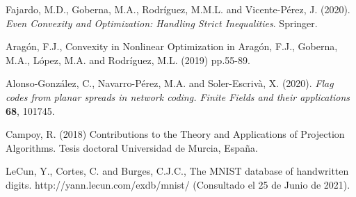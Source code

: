 \documentclass[12pt,twoside]{article}
\begin{document}
\begin{thebibliography}{100}




 Fajardo, M.D., Goberna, M.A., Rodríguez, M.M.L. and Vicente-Pérez, J. (2020).
\textit{Even Convexity and Optimization: Handling Strict Inequalities}. Springer.

 Aragón, F.J., Convexity in Nonlinear Optimization in Aragón, F.J., Goberna, M.A., López, M.A. and Rodríguez, M.L. (2019) pp.55-89.

 Alonso-González, C., Navarro-Pérez, M.A. and Soler-Escrivà, X. (2020). \textit{Flag codes from planar spreads in network coding. Finite Fields and their applications} \textbf{68}, 101745.


 Campoy, R. (2018) Contributions to the Theory and Applications of Projection Algorithms. Tesis doctoral Universidad de Murcia, España.

 LeCun, Y., Cortes, C. and Burges, C.J.C., The MNIST database of handwritten digits. http://yann.lecun.com/exdb/mnist/ (Consultado el 25 de Junio de 2021).


\end{thebibliography}


\newpage
\appendix
\end{document}
